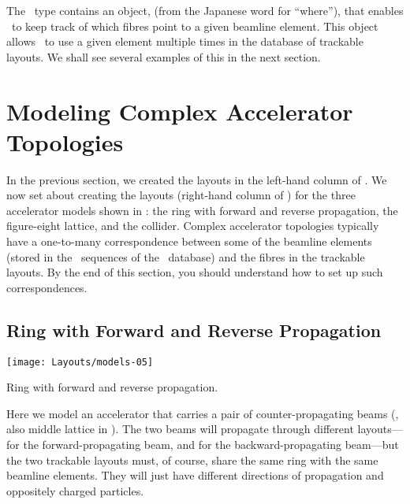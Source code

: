 %
The \PTC\ type  contains an object, 
(from the Japanese word for ``where''), that enables \PTC\ to
keep track of which fibres point to a given beamline element.
This object  allows \PTC\ to use a given element multiple
times in the database of trackable layouts. We shall see several
examples of this in the next section.


\section{Modeling Complex Accelerator Topologies}
\label{sec:model.topos}


%
In the previous section, we created the layouts in the left-hand
column of . We now set about creating the
layouts (right-hand column of ) for the three
accelerator models shown in : the ring with
forward and reverse propagation, the figure-eight lattice, and
the collider. Complex accelerator topologies typically have a
one-to-many correspondence between some of the beamline elements
(stored in the \DNA\ sequences of the \DNA\ database) and the
fibres in the trackable layouts. By the end of this section, you
should understand how to set up such correspondences.


\subsection{Ring with Forward and Reverse Propagation}

\begin{MarginFigure}[4\baselineskip] \forceversofloat
  \texttt{[image: Layouts/models-05]}
  \caption{Ring with forward and reverse propagation.}
  \label{fig:fwd.rev.ring}
\end{MarginFigure}

%
Here we model an accelerator that carries a pair of
counter-propagating beams (, also middle
lattice in ). The two beams will propagate
through different layouts--- for the forward-propagating
beam, and  for the backward-propagating beam---but
the two trackable layouts must, of course, share the same ring
with the same beamline elements. They will just have different
directions of propagation and oppositely charged particles.

